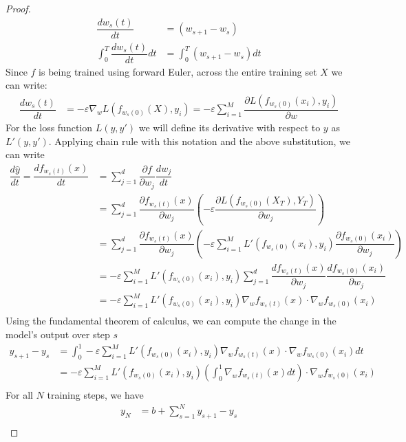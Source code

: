 \begin{proof}
\begin{align}
    \dfrac{d w_s(t)}{dt} &= (w_{s+1} - w_s)\\   
    \int_0^T \dfrac{d w_s(t)}{dt} dt &= \int_0^T (w_{s+1} - w_s)dt
\end{align}
Since $f$ is being trained using forward Euler, across the entire training set $X$ we can write:
\begin{align}
    \dfrac{d w_s(t)}{dt} &= -\varepsilon \nabla_w L(f_{w_s(0)}(X), y_i) = -\varepsilon  \sum_{i=1}^M  \dfrac{\partial L(f_{w_s(0)}(x_i),  y_i)}{\partial w} \label{eq10}
\end{align}
For the loss function $L(y, y')$ we will define its derivative with respect to $y$ as $L'(y, y')$. Applying chain rule with this notation and the above substitution, we can write
\begin{align}
    \dfrac{d \hat y}{dt} = \dfrac{d f_{w_s(t)}(x)}{dt} &= \sum_{j = 1}^{d} \dfrac{\partial f}{\partial w_j} \dfrac{d w_j}{dt}\\
&= \sum_{j = 1}^{d} \dfrac{\partial f_{w_s(t)}(x)}{\partial w_j} \left(-\varepsilon \dfrac{\partial L(f_{w_s(0)}(X_T),  Y_T)}{\partial w_j}\right)\\
&= \sum_{j = 1}^{d} \dfrac{\partial f_{w_s(t)}(x)}{\partial w_j} \left(-\varepsilon \sum_{i = 1}^{M}L'(f_{w_s(0)}(x_i),  y_i) \dfrac{\partial  f_{w_s(0)}(x_i)}{\partial w_j}\right)\\
&= -\varepsilon \sum_{i = 1}^{M} L'(f_{w_s(0)}(x_i),  y_i) \sum_{j = 1}^{d} \dfrac{d f_{w_s(t)}(x)}{\partial w_j}  \dfrac{d f_{w_s(0)}(x_i)}{\partial w_j}\\
&= -\varepsilon \sum_{i = 1}^{M} L'(f_{w_s(0)}(x_i),  y_i) \nabla_w f_{w_s(t)}(x) \cdot \nabla_w f_{w_s(0)}(x_i)\label{eq11}\\
\end{align}
Using the fundamental theorem of calculus, we can compute the change in the model's output over step $s$
\begin{align}
    y_{s+1} - y_s &= \int_0^1 -\varepsilon \sum_{i = 1}^{M} L'(f_{w_s(0)}(x_i),  y_i)  \nabla_w f_{w_s(t)}(x) \cdot \nabla_w f_{w_s(0)}(x_i)dt\\
 &=  -\varepsilon \sum_{i = 1}^{M} L'(f_{w_s(0)}(x_i),  y_i) \left(\int_0^1\nabla_w f_{w_s(t)}(x)dt\right) \cdot \nabla_w f_{w_s(0)}(x_i)\\
\end{align}
For all $N$ training steps, we have
\begin{align*}
y_N &= b + \sum_{s=1}^N y_{s+1} - y_s\\

\end{align*}
\end{proof}
